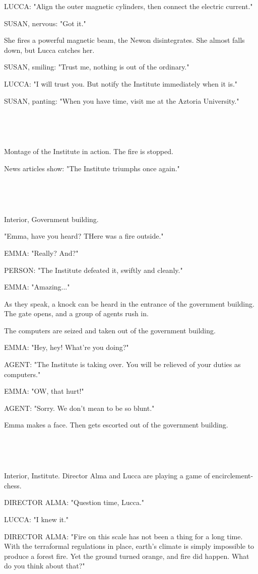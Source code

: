 \documentclass[11pt]{article}
\begin{document}
LUCCA: "Align the outer magnetic cylinders, then connect the electric current."

SUSAN, nervous: "Got it."

She fires a powerful magnetic beam, the Newon disintegrates.
She almost falls down, but Lucca catches her.

SUSAN, smiling: "Trust me, nothing is out of the ordinary."

LUCCA: "I will trust you.
But notify the Institute immediately when it is."

SUSAN, panting: "When you have time, visit me at the Aztoria University."

\ 

\ 

Montage of the Institute in action.
The fire is stopped.

News articles show: "The Institute triumphs once again."

\ 

\ 

Interior, Government building.

"Emma, have you heard? THere was a fire outside."

EMMA: "Really? And?"

PERSON: "The Institute defeated it, swiftly and cleanly."

EMMA: "Amazing..."

As they speak, a knock can be heard in the entrance of the government building.
The gate opens, and a group of agents rush in.

The computers are seized and taken out of the government building.

EMMA: "Hey, hey! What're you doing?"

AGENT: "The Institute is taking over. 
You will be relieved of your duties as computers."

EMMA: "OW, that hurt!"

AGENT: "Sorry. We don't mean to be so blunt."

Emma makes a face. Then gets escorted out of the government building.

\ 

\ 

Interior, Institute.
Director Alma and Lucca are playing a game of encirclement-chess.

DIRECTOR ALMA: "Question time, Lucca."

LUCCA: "I knew it."

DIRECTOR ALMA: "Fire on this scale has not been a thing for a long time.
With the terraformal regulations in place, earth's climate is simply impossible to produce a forest fire.
Yet the ground turned orange, and fire did happen.
What do you think about that?"
\end{document}

